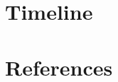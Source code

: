 \documentclass[12pt, oneside]{article}
\begin{document}
\section{Timeline}


\section{References}




\end{document}
